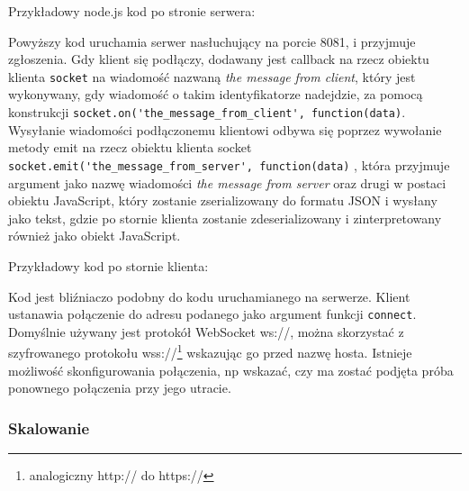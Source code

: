Przykładowy node.js kod po stronie serwera:



Powyższy kod uruchamia serwer nasłuchujący na porcie 8081, i przyjmuje zgłoszenia. Gdy klient się podłączy, dodawany jest callback na rzecz obiektu klienta \lstinline{socket} na wiadomość nazwaną \emph{the message from client}, który jest wykonywany, gdy wiadomość o takim identyfikatorze nadejdzie, za pomocą konstrukcji \lstinline{socket.on('the_message_from_client', function(data)}. Wysyłanie wiadomości podłączonemu klientowi odbywa się poprzez wywołanie metody emit na rzecz obiektu klienta socket \lstinline{socket.emit('the_message_from_server', function(data)} , która przyjmuje argument jako nazwę wiadomości \emph{the message from server} oraz drugi w postaci obiektu JavaScript, który zostanie zserializowany do formatu JSON i wysłany jako tekst, gdzie po stornie klienta zostanie zdeserializowany i zinterpretowany również jako obiekt JavaScript.

Przykładowy kod po stornie klienta:



Kod jest bliźniaczo podobny do kodu uruchamianego na serwerze. Klient ustanawia połączenie do adresu podanego jako argument funkcji \lstinline{connect}. Domyślnie używany jest protokół WebSocket ws://, można skorzystać z szyfrowanego protokołu wss://\footnote{analogiczny http:// do https://} wskazując go przed nazwę hosta. Istnieje możliwość skonfigurowania połączenia, np wskazać, czy ma zostać podjęta próba ponownego połączenia przy jego utracie.

\subsubsection{Skalowanie}
\label{subsub:scalability}


